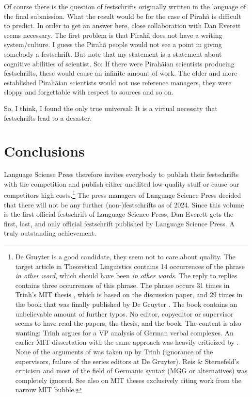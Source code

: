 \documentclass[output=paper,colorlinks,citecolor=brown]{langscibook}
\begin{document}
Of course there is the question of festschrifts originally written in the language of the final
submission. What the result would be for the case of Pirahã is difficult to predict. In order to get
an answer here, close collaboration with Dan Everett seems necessary. The first problem is that
Pirahã does not have a writing system/culture. I guess the Pirahã people would not see a point in giving
somebody a festschrift. But note that my statement is a statement about cognitive abilities of
scientist. So: If there were Pirahãian scientists producing festschrifts, these would cause an
infinite amount of work. The older and more established Pirahãian scientists would not use reference
managers, they were sloppy and forgettable with respect to sources and so on.

So, I think, I found the only true universal: It is a virtual necessity that fest\-schrifts lead to a
desaster.

\section{Conclusions}

Language Sciense Press therefore invites everybody to publish their festschrifts with the
competition and publish either unedited low-quality stuff or cause our competitors high
costs.\footnote{
  De Gruyter is a good candidate, they seem not to care about quality. The target article
  \citet{Trinh2009a-u} in Theoretical Linguistics contains 14 occurrences of the phrase \emph{in
    other word}, which should have been \emph{in other words}. The reply to replies
  \citep{Trinh2010a-u} contains three occurrences of this phrase. The phrase occurs 31 times in
  Trinh's MIT thesis \citeyearpar{Trinh2011a}, which is based on the discussion paper, and 29 times in the book that was finally published by De Gruyter
  \citep{Trinh2019a}. The book contains an unbelievable amount of further typos. No editor, copyeditor or
  supervisor seems to have read the papers, the thesis, and the book. The content is also wanting:
  Trinh argues for a VP analysis of German verbal complexes. An earlier MIT dissertation with the
  same approach was heavily criticized by \citet{ReisSternefeld2004}. None of the arguments of \citeauthor{ReisSternefeld2004} was taken up by Trinh (ignorance of the supervisors, failure of the series editors
  at De Gruyter). Reis \& Sternefeld's criticism and most of the field of Germanic syntax
  (MGG or alternatives) was completely ignored. See also \citet[]{ReisSternefeld2004} on
  MIT theses exclusively citing work from the narrow MIT bubble.
}
The press managers of Language Science Press decided that there will not be any further
(non-)festschrifts as of 2024. Since this volume is the first official festschrift of Language
Science Press, Dan Everett gets the first, last, and only official festschrift published by Language
Science Press. A truly outstanding achievement. 
\end{document}
